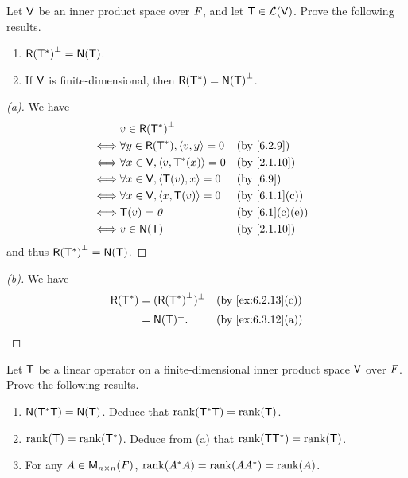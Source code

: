 \begin{ex}\label{ex:6.3.12}
  Let \(\mathsf{V}\) be an inner product space over \(\mathit{F}\), and let \(\mathsf{T} \in \mathcal{L}(\mathsf{V})\).
  Prove the following results.
  \begin{enumerate}
    \item \(\rg{\T^*}^{\perp} = \ns{\T}\).
    \item If \(\mathsf{V}\) is finite-dimensional, then \(\rg{\T^*} = \ns{\T}^{\perp}\).
  \end{enumerate}
\end{ex}

\begin{proof}[(a)]
  We have
  \begin{align*}
         & v \in \rg{\T^*}^{\perp}                                                   \\
    \iff & \forall y \in \rg{\T^*}, \inn{v, y} = 0 &  & \text{(by \cref{6.2.9})}     \\
    \iff & \forall x \in \V, \inn{v, \T^*(x)} = 0  &  & \text{(by \cref{2.1.10})}    \\
    \iff & \forall x \in \V, \inn{\T(v), x} = 0    &  & \text{(by \cref{6.9})}       \\
    \iff & \forall x \in \V, \inn{x, \T(v)} = 0    &  & \text{(by \cref{6.1.1}(c))}  \\
    \iff & \T(v) = \zv                             &  & \text{(by \cref{6.1}(c)(e))} \\
    \iff & v \in \ns{\T}                           &  & \text{(by \cref{2.1.10})}
  \end{align*}
  and thus \(\rg{\T^*}^{\perp} = \ns{\T}\).
\end{proof}

\begin{proof}[(b)]
  We have
  \begin{align*}
    \rg{\T^*} & = (\rg{\T^*}^{\perp})^{\perp} &  & \text{(by \cref{ex:6.2.13}(c))} \\
              & = \ns{\T}^{\perp}.            &  & \text{(by \cref{ex:6.3.12}(a))}
  \end{align*}
\end{proof}

\begin{ex}\label{ex:6.3.13}
  Let \(\mathsf{T}\) be a linear operator on a finite-dimensional inner product space \(\mathsf{V}\) over \(\mathit{F}\).
  Prove the following results.
  \begin{enumerate}
    \item \(\ns{\T^* \T} = \ns{\T}\).
          Deduce that \(\rk{\T^* \T} = \rk{\T}\).
    \item \(\rk{\T} = \rk{\T^*}\).
          Deduce from (a) that \(\rk{\T \T^*} = \rk{\T}\).
    \item For any \(A \in \mathsf{M}_{{n} \times n}({\mathit{F}})\), \(\rk{A^* A} = \rk{A A^*} = \rk{A}\).
  \end{enumerate}
\end{ex}

